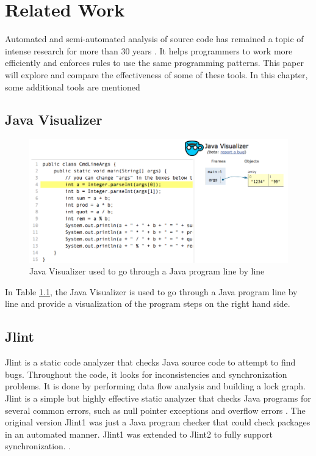 %
%
\chapter{Related Work}\label{ch:relatedwork}

 Automated and semi-automated analysis of source code has remained a topic of intense research for more than 30 years \cite{Binkley}. It helps programmers to work more efficiently and enforces rules to use the same programming patterns. This paper will explore and compare the effectiveness of some of these tools. In this chapter, some additional tools are mentioned 
 


\section{Java Visualizer}

\begin{figure}[htbp]
\includegraphics[scale=0.5]{JavaVisualizer}
\caption{Java Visualizer used to go through a Java program line by line}
\label{fig:jv}
\end{figure}

In Table \ref{fig:jv}, the Java Visualizer is used to go through a Java program line by line and provide a visualization of the program steps on the right hand side.

\section{Jlint}
Jlint is a static code analyzer that checks Java source code to attempt to find bugs. Throughout the code, it looks for inconsistencies and synchronization problems. It is done by performing data flow analysis and building a lock graph. Jlint is a simple but highly effective static analyzer that checks Java programs for several common errors, such as null pointer exceptions and overflow errors \cite{artho_havelund}.
The original version Jlint1 was just a Java program checker that could check packages in an automated manner. Jlint1 was extended to Jlint2 to fully support synchronization. \cite{Artho:2001:ASA:872024.872575}.
